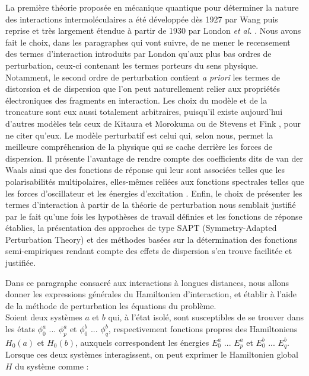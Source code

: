 	
	La première théorie proposée en mécanique quantique pour déterminer la nature des interactions intermoléculaires a été développée dès 1927 par Wang \cite{wang1927mutual} puis reprise et très largement étendue à partir de 1930 par London \textit{et al.} \cite{london1930z}. Nous avons fait le choix, dans les paragraphes qui vont suivre, de ne mener le recensement des termes d’interaction introduits par London qu'aux plus bas ordres de perturbation, ceux-ci contenant les termes porteurs du sens physique. Notamment, le second ordre de perturbation contient \textit{a priori} les termes de distorsion et de dispersion que l’on peut naturellement relier aux propriétés électroniques des fragments en interaction. Les choix du modèle et de la troncature sont eux aussi totalement arbitraires, puisqu’il existe aujourd’hui d’autres modèles tels ceux de Kitaura et Morokuma \cite{morokuma1977molecules} ou de Stevens et Fink \cite{stevens1987frozen}, pour ne citer qu’eux. Le modèle perturbatif est celui qui, selon nous, permet la meilleure compréhension de la physique qui se cache derrière les forces de dispersion. Il présente l'avantage de rendre compte des coefficients dits de van der Waals ainsi que des fonctions de réponse qui leur sont associées telles que les polarisabilités multipolaires, elles-mêmes reliées aux fonctions spectrales telles que les forces d’oscillateur et les énergies d’excitation \cite{begue1999dynamic}. Enfin, le choix de présenter les termes d’interaction à partir de la théorie de perturbation nous semblait justifié par le fait qu’une fois les hypothèses de travail définies et les fonctions de réponse établies, la présentation des approches de type SAPT (Symmetry-Adapted Perturbation Theory) et des méthodes basées sur la détermination des fonctions semi-empiriques rendant compte des effets de dispersion s’en trouve facilitée et justifiée.
	
	
	Dans ce paragraphe consacré aux interactions à longues distances, nous allons donner les expressions générales du Hamiltonien d'interaction, et établir à l'aide de la méthode de perturbation les équations du problème.\\ 
	
	Soient deux systèmes $a$ et $b$ qui, à l'état isolé, sont susceptibles de se trouver dans les états $\phi_{0}^{a}$ ... $\phi_{p}^{a}$ et $\phi_{0}^{b}$ ... $\phi_{q}^{b}$, respectivement fonctions propres des Hamiltoniens $H_{0}(a)$ et $H_{0}(b)$, auxquels correspondent les énergies $E_{0}^{a}$ ... $E_{p}^{a}$ et $E_{0}^{b}$ ... $E_{q}^{b}$. Lorsque ces deux systèmes interagissent, on peut exprimer le Hamiltonien global $H$ du système comme : 
	
